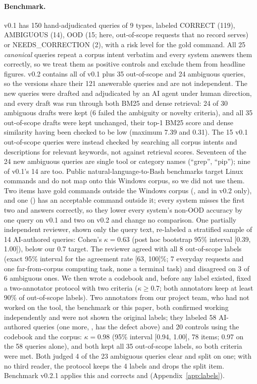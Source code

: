 \paragraph{Benchmark.} v0.1 has 150 hand-adjudicated queries of 9 types, labeled CORRECT (119), AMBIGUOUS
(14), OOD (15; here, out-of-scope requests that no record serves) or NEEDS\_CORRECTION (2), with a risk level for the
gold command. All 25 \emph{canonical} queries repeat a corpus intent verbatim and every system answers them correctly, so
we treat them as positive controls and exclude them from headline figures. v0.2 contains all of v0.1 plus 35
out-of-scope and 24 ambiguous queries, so the versions share their 121 answerable queries and are not
independent. The new queries were drafted and adjudicated by an AI agent under human direction, and every
draft was run through both BM25 and dense retrieval: 24 of 30 ambiguous drafts were kept (6 failed the ambiguity
or novelty criteria), and all 35 out-of-scope drafts were kept unchanged, their top-1 BM25 score and dense
similarity having been checked to be low (maximum 7.39 and 0.31). The 15 v0.1 out-of-scope queries were instead
checked by searching all corpus intents and descriptions for relevant keywords, not against retrieval scores.
Seventeen of the 24 new ambiguous queries are single tool or category names (``grep'', ``pip''); nine of v0.1's
14 are too. Public natural-language-to-Bash benchmarks target Linux commands and do not map onto this Windows
corpus, so we did not use them. Two items have gold commands outside the Windows corpus (, and
 in v0.2 only), and one () has an acceptable command outside it; every system misses the first
two and answers  correctly, so they lower every system's non-OOD accuracy by one query on v0.1 and two on
v0.2 and change no comparison. One partially independent reviewer, shown only the query text, re-labeled a
stratified sample of 14 AI-authored queries: Cohen's $\kappa=0.63$ \citep{cohen1960coefficient} (post hoc bootstrap
95\% interval [0.39, 1.00]), below our 0.7 target. The reviewer agreed with all 8 out-of-scope labels (exact 95\%
interval for the agreement rate [63, 100]\%; 7 everyday requests and one far-from-corpus computing task, none a
terminal task) and disagreed on 3 of 6 ambiguous ones. We then wrote a codebook and, before any label existed,
fixed a two-annotator protocol with two criteria ($\kappa\geq0.7$; both annotators keep at least 90\% of out-of-scope
labels). Two annotators from our project team, who had not worked on the tool, the benchmark or this paper, both
confirmed working independently and were not shown the original labels; they labeled
58 AI-authored queries (one more, , has the defect above) and 20 controls using the codebook and the
corpus: $\kappa=0.98$ (95\% interval [0.94, 1.00], 78 items; 0.97 on the 58 queries alone), and both kept all 35 out-of-scope labels, so both
criteria were met. Both judged 4 of the 23 ambiguous queries clear and split on one; with no third reader, the
protocol keeps the 4 labels and drops the split item. Benchmark v0.2.1 applies this and corrects  and
 (Appendix~\ref{app:labels}).

